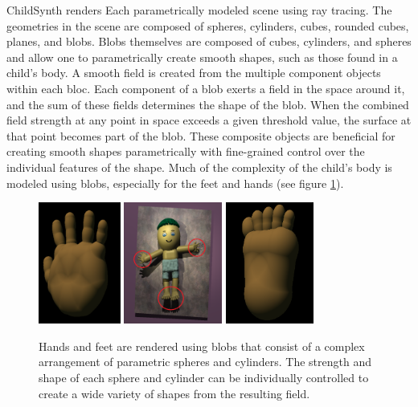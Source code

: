 \documentclass{article}
\begin{document}
ChildSynth renders Each parametrically modeled scene using ray tracing. The geometries in the scene are composed of spheres, cylinders, cubes, rounded cubes, planes, and blobs. Blobs themselves are composed of cubes, cylinders, and spheres and allow one to parametrically create smooth shapes, such as those found in a child's body. A smooth field is created from the multiple component objects within each bloc. Each component of a blob exerts a field in the space around it, and the sum of these fields determines the shape of the blob. When the combined field strength at any point in space exceeds a given threshold value, the surface at that point becomes part of the blob. These composite objects are beneficial for creating smooth shapes parametrically with fine-grained control over the individual features of the shape. Much of the complexity of the child's body is modeled using blobs, especially for the feet and hands (see figure \ref{fig:hand_foot}). 

\begin{figure}[htbp]
    \centering
    \includegraphics[height=4cm]{plots/hand.png}
    \includegraphics[height=4cm]{plots/child_000000_rgb_090.png}
    \includegraphics[height=4cm]{plots/foot.png}
    \caption{Hands and feet are rendered using blobs that consist of a complex arrangement of parametric spheres and cylinders. The strength and shape of each sphere and cylinder can be individually controlled to create a wide variety of shapes from the resulting field.}
    \label{fig:hand_foot}
\end{figure}
\end{document}

